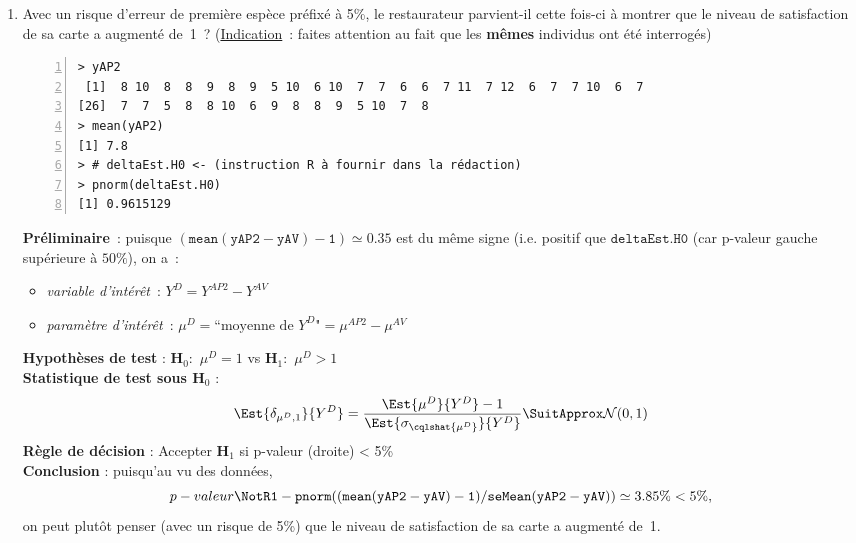 \documentclass[10pt]{report}
\begin{document}
\begin{exercice}
\begin{enumerate}
\item Avec un risque d'erreur de premi{\`e}re esp{\`e}ce pr{\'e}fix{\'e} {\`a} 5\%, le restaurateur parvient-il cette fois-ci {\`a} montrer que le niveau de satisfaction de sa carte a augment{\'e} de~1~? (\underline{Indication}~: faites attention au fait que les \textbf{m{\^e}mes} individus ont {\'e}t{\'e} interrog{\'e}s)

\IndicR
\begin{Verbatim}[frame=leftline,fontfamily=tt,fontshape=n,numbers=left]
> yAP2
 [1]  8 10  8  8  9  8  9  5 10  6 10  7  7  6  6  7 11  7 12  6  7  7 10  6  7
[26]  7  7  5  8  8 10  6  9  8  8  9  5 10  7  8
> mean(yAP2)
[1] 7.8
> # deltaEst.H0 <- (instruction R à fournir dans la rédaction)
> pnorm(deltaEst.H0)
[1] 0.9615129
\end{Verbatim}

 

\begin{Correction}
\noindent \textbf{Préliminaire}~: puisque  $\mathtt{(mean(yAP2-yAV)-1)}\simeq0.35$ est du même signe (i.e. positif que $\mathtt{deltaEst.H0}$ (car p-valeur gauche supérieure à $50\%$), on a~:
    \begin{itemize}
\item \textit{variable d'intérêt}~: $Y^{D}=Y^{AP2}-Y^{AV}$
\item \textit{paramètre d'intérêt}~: $\mu^{D}=\mbox{``moyenne de $Y^{D}$"}=\mu^{AP2}-\mu^{AV}$
\end{itemize}
\noindent \textbf{Hypothèses de test} : $\mathbf{H}_0:$ $\mu^{D}=1$ vs {\large $\mathbf{H}_1:$ $\mu^{D}>1$}\\
\textbf{Statistique de test sous $\mathbf{H}_0$} :
  $$
  \Est{\delta_{\mu^{D},1}}{Y^{D}}= {\displaystyle \frac{\Est{\mu^{D}}{Y^{D}}-1}{
\Est{\sigma_{\cqlshat{\mu^{D}}}}{Y^{D}}
}} 
  \SuitApprox \mathcal{N}(0,1)
  $$
\textbf{Règle de décision} : Accepter $\mathbf{H}_1$ si 
  p-valeur (droite) < 5\%\\
\noindent \textbf{Conclusion} :
puisqu'au vu des données, 
  \[
p-valeur\NotR\mathtt{1-pnorm((mean(yAP2-yAV)-1)/seMean(yAP2-yAV))} \simeq 3.85\% < 5\%,
\]
on peut plutôt penser (avec un risque de 5\%) que le niveau de satisfaction de sa carte a augmenté de~1.
\end{Correction}


\end{enumerate}
 
\end{exercice}
\end{document}
